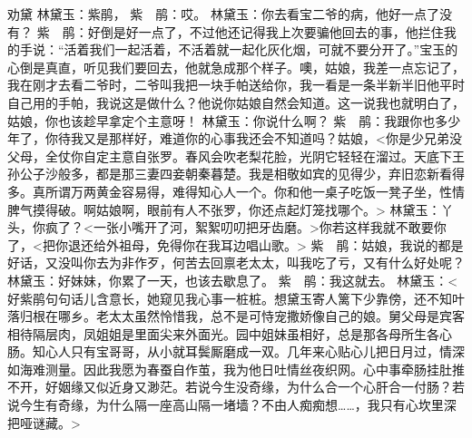 \documentclass{article}
\begin{document}
劝黛
林黛玉：紫鹃，
紫　鹃：哎。
林黛玉：你去看宝二爷的病，他好一点了没有？
紫　鹃：好倒是好一点了，不过他还记得我上次要骗他回去的事，他拦住我的手说：“活着我们一起活着，不活着就一起化灰化烟，可就不要分开了。”宝玉的心倒是真直，听见我们要回去，他就急成那个样子。噢，姑娘，我差一点忘记了，我在刚才去看二爷时，二爷叫我把一块手帕送给你，我一看是一条半新半旧他平时自己用的手帕，我说这是做什么？他说你姑娘自然会知道。这一说我也就明白了，姑娘，你也该趁早拿定个主意呀！
林黛玉：你说什么啊？
紫　鹃：我跟你也多少年了，你待我又是那样好，难道你的心事我还会不知道吗？姑娘，<你是少兄弟没父母，全仗你自定主意自张罗。春风会吹老梨花脸，光阴它轻轻在溜过。天底下王孙公子沙般多，都是那三妻四妾朝秦暮楚。我是相敬如宾的见得少，弃旧恋新看得多。真所谓万两黄金容易得，难得知心人一个。你和他一桌子吃饭一凳子坐，性情脾气摸得破。啊姑娘啊，眼前有人不张罗，你还点起灯笼找哪个。>
林黛玉：丫头，你疯了？<一张小嘴开了河，絮絮叨叨把牙齿磨。>你若这样我就不敢要你了，<把你退还给外祖母，免得你在我耳边唱山歌。>
紫　鹃：姑娘，我说的都是好话，又没叫你去为非作歹，何苦去回禀老太太，叫我吃了亏，又有什么好处呢？
林黛玉：好妹妹，你累了一天，也该去歇息了。
紫　鹃：我这就去。
林黛玉：<好紫鹃句句话儿含意长，她窥见我心事一桩桩。想黛玉寄人篱下少靠傍，还不知叶落归根在哪乡。老太太虽然怜惜我，总不是可恃宠撒娇像自己的娘。舅父母是宾客相待隔层肉，凤姐姐是里面尖来外面光。园中姐妹虽相好，总是那各母所生各心肠。知心人只有宝哥哥，从小就耳鬓厮磨成一双。几年来心贴心儿把日月过，情深如海难测量。因此我愿为春蚕自作茧，我为他日吐情丝夜织网。心中事牵肠挂肚推不开，好姻缘又似近身又渺茫。若说今生没奇缘，为什么合一个心肝合一付肠？若说今生有奇缘，为什么隔一座高山隔一堵墙？不由人痴痴想……，我只有心坎里深把哑谜藏。>
\end{document}
